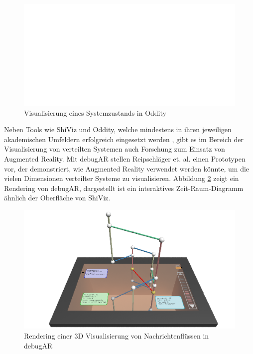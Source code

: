 \documentclass[12pt,a4paper]{report}
\begin{document}
\begin{figure}[H]
	\centering
	\includegraphics[width=\linewidth]{img/oddity_raft_state.pdf}
    \caption{Visualisierung eines Systemzustands in Oddity \cite{oddity_graphical_debugger}}
	\label{fig:oddity}
\end{figure}

Neben Tools wie ShiViz und Oddity, welche mindestens in ihren jeweiligen akademischen Umfeldern erfolgreich eingesetzt werden
\cite{ShiViz_usage_study, oddity_usage_in_education}, gibt es im Bereich der Visualisierung von verteilten Systemen auch Forschung
zum Einsatz von Augmented Reality. Mit debugAR stellen Reipschläger et. al. \cite{debugAR_AR_debugger} einen Prototypen vor, der
demonstriert, wie Augmented Reality verwendet werden könnte, um die vielen Dimensionen verteilter Systeme zu visualisieren.
Abbildung \ref{fig:debugAR} zeigt ein Rendering von debugAR, dargestellt ist ein interaktives Zeit-Raum-Diagramm ähnlich der
Oberfläche von ShiViz.

\begin{figure}[H]
	\centering
	\includegraphics[width=\linewidth]{img/debugAR_rendering.png}
    \caption{Rendering einer 3D Visualisierung von Nachrichtenflüssen in debugAR \cite{debugAR_AR_debugger}}
	\label{fig:debugAR}
\end{figure}
\end{document}
